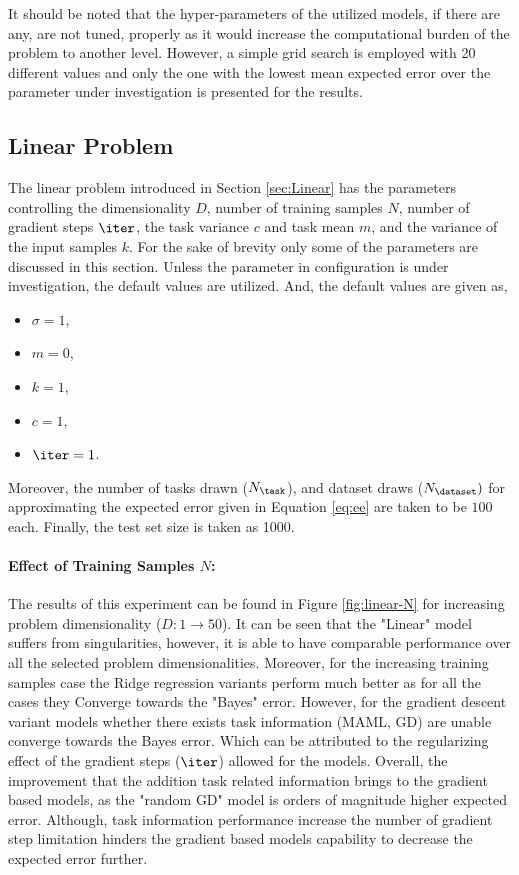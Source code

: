 It should be noted that the hyper-parameters of the utilized models, if there are any, are not tuned, properly as it would increase the computational burden of the problem to another level. However, a simple grid search is employed with 20 different values and only the one with the lowest mean expected error over the parameter under investigation is presented for the results. 

\subsection{Linear Problem}
The linear problem introduced in Section \ref{sec:Linear} has the parameters controlling the dimensionality $D$, number of training samples $N$, number of gradient steps $\iter$, the task variance $c$ and task mean $m$, and the variance of the input samples $k$. For the sake of brevity only some of the parameters are discussed in this section. Unless the parameter in configuration is under investigation, the default values are utilized. And, the default values are given as,
\begin{itemize}
  \item $\sigma=1$,
  \item $m=0$,
  \item $k=1$,
  \item $c=1$,
  \item $\iter=1$.
\end{itemize}
Moreover, the number of tasks drawn ($N_{\task}$), and dataset draws ($N_{\dataset})$  for approximating the expected error given in Equation \ref{eq:ee} are taken to be $100$ each. Finally, the test set size is taken as 1000.

\paragraph{Effect of Training Samples $N$:} The results of this experiment can be found in Figure \ref{fig:linear-N} for increasing problem dimensionality ($D:1\to50$). It can be seen that the "Linear" model suffers from singularities, however, it is able to have comparable performance over all the selected problem dimensionalities. Moreover, for the increasing training samples case the Ridge regression variants perform much better as for all the cases they Converge towards the "Bayes" error. However, for the gradient descent variant models whether there exists task information (\eg MAML, GD) are unable converge towards the Bayes error. Which can be attributed to the regularizing effect of the gradient steps ($\iter$) allowed for the models. Overall, the improvement that the addition task related information brings to the gradient based models, as the "random GD" model is orders of magnitude higher expected error. Although, task information performance increase the number of gradient step limitation hinders the gradient based models capability to decrease the expected error further.

